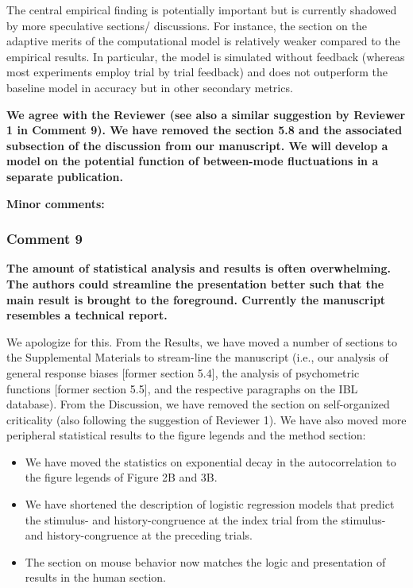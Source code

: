 \documentclass[
]{article}
\begin{document}
The central empirical finding is potentially important but is currently
shadowed by more speculative sections/ discussions. For instance, the
section on the adaptive merits of the computational model is relatively
weaker compared to the empirical results. In particular, the model is
simulated without feedback (whereas most experiments employ trial by
trial feedback) and does not outperform the baseline model in accuracy
but in other secondary metrics.

\textbf{We agree with the Reviewer (see also a similar suggestion by
Reviewer 1 in Comment 9). We have removed the section 5.8 and the
associated subsection of the discussion from our manuscript. We will
develop a model on the potential function of between-mode fluctuations
in a separate publication.}

\textbf{Minor comments:}

\hypertarget{comment-9-1}{%
\subsubsection{Comment 9}\label{comment-9-1}}

\textbf{The amount of statistical analysis and results is often
overwhelming. The authors could streamline the presentation better such
that the main result is brought to the foreground. Currently the
manuscript resembles a technical report.}

We apologize for this. From the Results, we have moved a number of
sections to the Supplemental Materials to stream-line the manuscript
(i.e., our analysis of general response biases {[}former section 5.4{]},
the analysis of psychometric functions {[}former section 5.5{]}, and the
respective paragraphs on the IBL database). From the Discussion, we have
removed the section on self-organized criticality (also following the
suggestion of Reviewer 1). We have also moved more peripheral
statistical results to the figure legends and the method section:

\begin{itemize}
\item
  We have moved the statistics on exponential decay in the
  autocorrelation to the figure legends of Figure 2B and 3B.
\item
  We have shortened the description of logistic regression models that
  predict the stimulus- and history-congruence at the index trial from
  the stimulus- and history-congruence at the preceding trials.
\item
  The section on mouse behavior now matches the logic and presentation
  of results in the human section.
\end{itemize}
\end{document}
